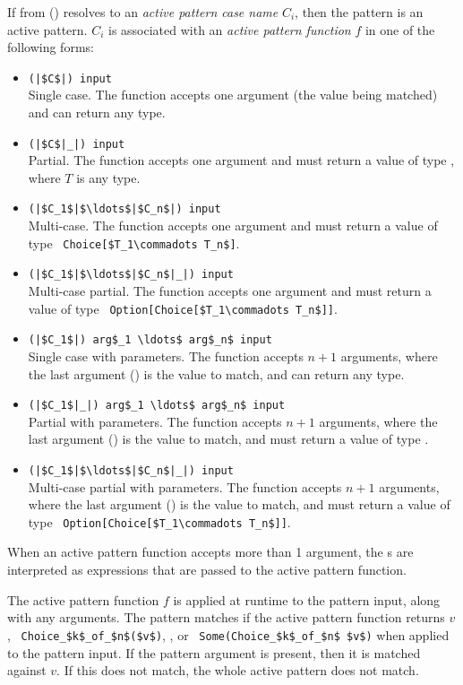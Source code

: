 If  from () resolves to an {\em active pattern case name} $C_i$, then the pattern is an active pattern. $C_i$ is associated with an {\em active pattern function} $f$ in one of the following forms:
\begin{itemize}
  \item \lstinline!(|$C$|) input! \\
    Single case. The function accepts one argument (the value being matched) and can return any type. 
  \item \lstinline!(|$C$|_|) input! \\
    Partial. The function accepts one argument and must return a value of type , where $T$ is any type. 
  \item \lstinline!(|$C_1$|$\ldots$|$C_n$|) input! \\
    Multi-case. The function accepts one argument and must return a value of type ~\lstinline!Choice[$T_1\commadots T_n$]!. 
  \item \lstinline!(|$C_1$|$\ldots$|$C_n$|_|) input! \\
    Multi-case partial. The function accepts one argument and must return a value of type ~\lstinline!Option[Choice[$T_1\commadots T_n$]]!. 
  \item \lstinline!(|$C_1$|) arg$_1 \ldots$ arg$_n$ input! \\
    Single case with parameters. The function accepts $n+1$ arguments, where the last argument () is the value to match, and can return any type. 
  \item \lstinline!(|$C_1$|_|) arg$_1 \ldots$ arg$_n$ input! \\
    Partial with parameters. The function accepts $n+1$ arguments, where the last argument () is the value to match, and must return a value of type . 
  \item \lstinline!(|$C_1$|$\ldots$|$C_n$|_|) input! \\
    Multi-case partial with parameters. The function accepts $n+1$ arguments, where the last argument () is the value to match, and must return a value of type ~\lstinline!Option[Choice[$T_1\commadots T_n$]]!.
\end{itemize}

When an active pattern function accepts more than 1 argument, the s are interpreted as expressions that are passed to the active pattern function. 

The active pattern function $f$ is applied at runtime to the pattern input, along with any arguments. The pattern matches if the active pattern function returns $v$, ~\lstinline!Choice_$k$_of_$n$($v$)!, , or ~\lstinline!Some(Choice_$k$_of_$n$ $v$)! when applied to the pattern input. If the pattern argument  is present, then it is matched against $v$. If this does not match, the whole active pattern does not match. 


